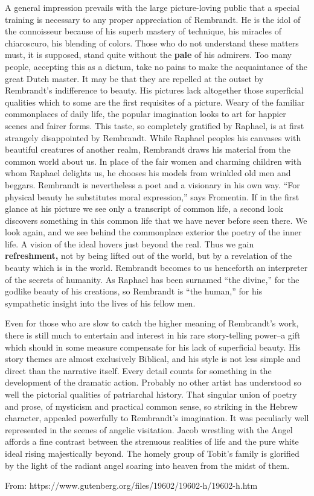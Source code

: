 \bigskip
\begin{linenumbers*}
\modulolinenumbers[5]
\indent A general impression prevails with the large picture-loving public that a special training is necessary to any proper appreciation of Rembrandt. He is the idol of the connoisseur because of his superb mastery of technique, his miracles of chiaroscuro, his blending of colors. Those who do not understand these matters must, it is supposed, stand quite without the \textbf{pale} of his admirers. Too many people, accepting this as a dictum, take no pains to make the acquaintance of the great Dutch master. It may be that they are repelled at the outset by Rembrandt's indifference to beauty. His pictures lack altogether those superficial qualities which to some are the first requisites of a picture. Weary of the familiar commonplaces of daily life, the popular imagination looks to art for happier scenes and fairer forms. This taste, so completely gratified by Raphael, is at first strangely disappointed by Rembrandt. While Raphael peoples his canvases with beautiful creatures of another realm, Rembrandt draws his material from the common world about us. In place of the fair women and charming children with whom Raphael delights us, he chooses his models from wrinkled old men and beggars. Rembrandt is nevertheless a poet and a visionary in his own way. ``For physical beauty he substitutes moral expression,'' says Fromentin. If in the first glance at his picture we see only a transcript of common life, a second look discovers something in this common life that we have never before seen there. We look again, and we see behind the commonplace exterior the poetry of the inner life. A vision of the ideal hovers just beyond the real. Thus we gain \textbf{refreshment,} not by being lifted out of the world, but by a revelation of the beauty which is in the world. Rembrandt becomes to us henceforth an interpreter of the secrets of humanity. As Raphael has been surnamed ``the divine,'' for the godlike beauty of his creations, so Rembrandt is ``the human,'' for his sympathetic insight into the lives of his fellow men.

\indent Even for those who are slow to catch the higher meaning of Rembrandt's work, there is still much to entertain and interest in his rare story-telling power--a gift which should in some measure compensate for his lack of superficial beauty. His story themes are almost exclusively Biblical, and his style is not less simple and direct than the narrative itself. Every detail counts for something in the development of the dramatic action. Probably no other artist has understood so well the pictorial qualities of patriarchal history. That singular union of poetry and prose, of mysticism and practical common sense, so striking in the Hebrew character, appealed powerfully to Rembrandt's imagination. It was peculiarly well represented in the scenes of angelic visitation. Jacob wrestling with the Angel affords a fine contrast between the strenuous realities of life and the pure white ideal rising majestically beyond. The homely group of Tobit's family is glorified by the light of the radiant angel soaring into heaven from the midst of them.
\end{linenumbers*}
From: https://www.gutenberg.org/files/19602/19602-h/19602-h.htm

